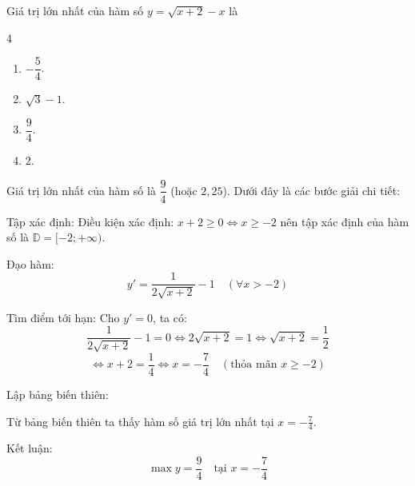 \begin{baitap}
	Giá trị lớn nhất của hàm số $y = \sqrt{x + 2} - x$ là
	\begin{multicols}{4}
		\begin{enumerate}
			\item $-\dfrac{5}{4}$.
			\item $\sqrt{3} - 1$.
			\item $\dfrac{9}{4}$.
			\item $2$.
		\end{enumerate}
	\end{multicols}
	\begin{traloi}
		Giá trị lớn nhất của hàm số là $\dfrac{9}{4}$ (hoặc $2,25$). Dưới đây là các bước giải chi tiết:
		
		Tập xác định: Điều kiện xác định: $x + 2 \ge 0 \Leftrightarrow  x \ge -2$ nên tập xác định của hàm số là $\mathbb{D} = [-2; +\infty)$.
		
		Đạo hàm: $$y' = \dfrac{1}{2\sqrt{x + 2}} - 1 \quad (\forall x > -2)$$
		
		Tìm điểm tới hạn: Cho $y' = 0$, ta có:$$\dfrac{1}{2\sqrt{x + 2}} - 1 = 0 \iff 2\sqrt{x + 2} = 1 \iff \sqrt{x + 2} = \dfrac{1}{2}$$$$\iff x + 2 = \dfrac{1}{4} \iff x = -\dfrac{7}{4} \quad (\text{thỏa mãn } x \ge -2)$$
		
		Lập bảng biến thiên: 
			\begin{center}
			\end{center}
			Từ bảng biến thiên ta thấy hàm số giá trị lớn nhất tại $x = -\frac{7}{4}$.
			
			Kết luận:$$\max y = \dfrac{9}{4} \quad \text{tại } x = -\dfrac{7}{4}$$
	\end{traloi}
\end{baitap}

